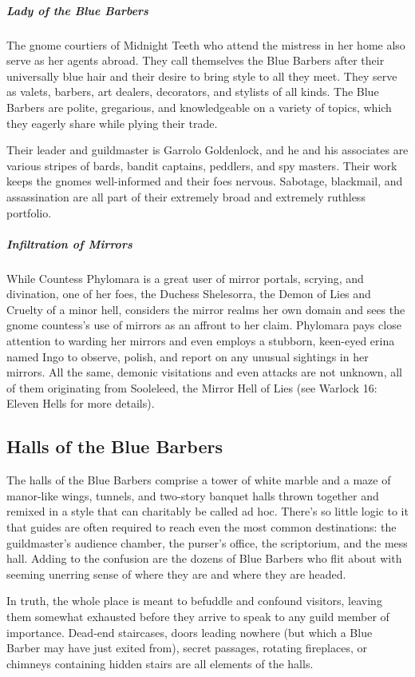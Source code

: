 \documentclass[10pt,a4paper,twoside,bg=print,twocolumn,openany,nodeprecatedcode]{dndbook}
\begin{document}
\subparagraph{Lady of the Blue Barbers}
The gnome courtiers of Midnight Teeth who attend the mistress in her home also serve as her agents abroad. They call themselves the Blue Barbers after their universally blue hair and their desire to bring style to all they meet. They serve as valets, barbers, art dealers, decorators, and stylists of all kinds. The Blue Barbers are polite, gregarious, and knowledgeable on a variety of topics, which they eagerly share while plying their trade.

Their leader and guildmaster is Garrolo Goldenlock, and he and his associates are various stripes of bards, bandit captains, peddlers, and spy masters. Their work keeps the gnomes well-informed and their foes nervous. Sabotage, blackmail, and assassination are all part of their extremely broad and extremely ruthless portfolio.

\subparagraph{Infiltration of Mirrors}
While Countess Phylomara is a great user of mirror portals, scrying, and divination, one of her foes, the Duchess Shelesorra, the Demon of Lies and Cruelty of a minor hell, considers the mirror realms her own domain and sees the gnome countess's use of mirrors as an affront to her claim. Phylomara pays close attention to warding her mirrors and even employs a stubborn, keen-eyed erina named Ingo to observe, polish, and report on any unusual sightings in her mirrors. All the same, demonic visitations and even attacks are not unknown, all of them originating from Sooleleed, the Mirror Hell of Lies (see Warlock 16: Eleven Hells for more details).

\subsection{Halls of the Blue Barbers}
The halls of the Blue Barbers comprise a tower of white marble and a maze of manor-like wings, tunnels, and two-story banquet halls thrown together and remixed in a style that can charitably be called ad hoc. There's so little logic to it that guides are often required to reach even the most common destinations: the guildmaster's audience chamber, the purser's office, the scriptorium, and the mess hall. Adding to the confusion are the dozens of Blue Barbers who flit about with seeming unerring sense of where they are and where they are headed.

In truth, the whole place is meant to befuddle and confound visitors, leaving them somewhat exhausted before they arrive to speak to any guild member of importance. Dead-end staircases, doors leading nowhere (but which a Blue Barber may have just exited from), secret passages, rotating fireplaces, or chimneys containing hidden stairs are all elements of the halls.
\end{document}
